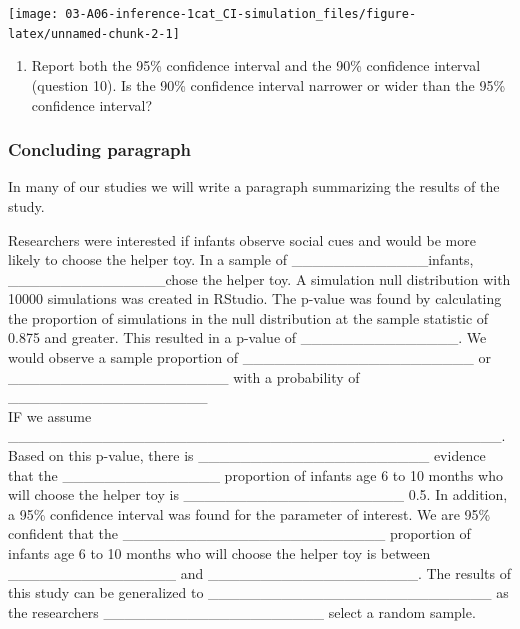 \documentclass[
]{report}
\providecommand{\tightlist}{%
  \setlength{\itemsep}{0pt}\setlength{\parskip}{0pt}}
\begin{document}
\begin{center}\texttt{[image: 03-A06-inference-1cat\_CI-simulation\_files/figure-latex/unnamed-chunk-2-1]} \end{center}

\begin{enumerate}
\def\labelenumi{\arabic{enumi}.}
\setcounter{enumi}{10}
\tightlist
\item
  Report both the 95\% confidence interval and the 90\% confidence interval (question 10). Is the 90\% confidence interval narrower or wider than the 95\% confidence interval?
\end{enumerate}

\vspace{0.5in}


\subsubsection*{Concluding paragraph}\label{concluding-paragraph}

In many of our studies we will write a paragraph summarizing the results of the study.

Researchers were interested if infants observe social cues and would be more likely to choose the helper toy. In a sample of \_\_\_\_\_\_\_\_\_\_\_\_\_infants, \_\_\_\_\_\_\_\_\_\_\_\_\_\_\_chose the helper toy. A simulation null distribution with 10000 simulations was created in RStudio. The p-value was found by calculating the proportion of simulations in the null distribution at the sample statistic of 0.875 and greater. This resulted in a p-value of \_\_\_\_\_\_\_\_\_\_\_\_\_\_\_. We would observe a sample proportion of \_\_\_\_\_\_\_\_\_\_\_\_\_\_\_\_\_\_\_\_\_\_ or \_\_\_\_\_\_\_\_\_\_\_\_\_\_\_\_\_\_\_\_\_ with a probability of \_\_\_\_\_\_\_\_\_\_\_\_\_\_\_\_\_\_\_\\
IF we assume \_\_\_\_\_\_\_\_\_\_\_\_\_\_\_\_\_\_\_\_\_\_\_\_\_\_\_\_\_\_\_\_\_\_\_\_\_\_\_\_\_\_\_\_\_\_\_.
Based on this p-value, there is \_\_\_\_\_\_\_\_\_\_\_\_\_\_\_\_\_\_\_\_\_\_ evidence that the \_\_\_\_\_\_\_\_\_\_\_\_\_\_\_ proportion of infants age 6 to 10 months who will choose the helper toy is \_\_\_\_\_\_\_\_\_\_\_\_\_\_\_\_\_\_\_\_\_ 0.5. In addition, a 95\% confidence interval was found for the parameter of interest. We are 95\% confident that the \_\_\_\_\_\_\_\_\_\_\_\_\_\_\_\_\_\_\_\_\_\_\_\_\_ proportion of infants age 6 to 10 months who will choose the helper toy is between \_\_\_\_\_\_\_\_\_\_\_\_\_\_\_\_ and \_\_\_\_\_\_\_\_\_\_\_\_\_\_\_\_\_\_\_\_. The results of this study can be generalized to \_\_\_\_\_\_\_\_\_\_\_\_\_\_\_\_\_\_\_\_\_\_\_\_\_\_\_ as the researchers \_\_\_\_\_\_\_\_\_\_\_\_\_\_\_\_\_\_\_\_\_ select a random sample.
\end{document}
